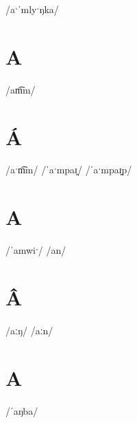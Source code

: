 \documentclass[10pt,a4paper,twoside]{book}
\begin{document}
\begin{multicols}{3}
 {/aˑˈmlyˑŋka/} {}
\end{multicols}

\section*{A}

\begin{multicols}{3}
 {/am͡m/} {}
\end{multicols}

\section*{Á}

\begin{multicols}{3}
 {/aˑm͡m/} {}
 {/ˈaˑmpaɪ̯/} {}
 {/ˈaˑmpaɪ̯p/} {}
\end{multicols}

\section*{A}

\begin{multicols}{3}
 {/ˈamwiˑ/} {}
 {/an/} {}
\end{multicols}

\section*{Â}

\begin{multicols}{3}
 {/aːŋ/} {}
 {/aːn/} {}
\end{multicols}

\section*{A}

\begin{multicols}{3}
 {/ˈaŋba/} {}
\end{multicols}
\end{document}
